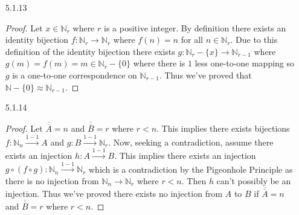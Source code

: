 \documentclass[11pt]{amsart}
\theoremstyle{definition}
\begin{document}
\begin{itemize}
\item[5.1.13] \begin{proof}
		Let $x\in\mathbb{N}_r$ where $r$ is a positive integer. By definition there exists an identity bijection $f:\mathbb{N}_r\to\mathbb{N}_r$ where $f(n)=n$ for all $n\in\mathbb{N}_r$. Due to this definition of the identity bijection there exists $g:\mathbb{N}_r-\{x\}\to\mathbb{N}_{r-1}$ where $g(m)=f(m)=m\in\mathbb{N}_r-\{0\}$ where there is $1$ less one-to-one mapping so $g$ is a one-to-one correspondence on $\mathbb{N}_{r-1}$. Thus we've proved that $\mathbb{N}-\{0\}\approx\mathbb{N}_{r-1}$.
\end{proof}

\item[5.1.14] \begin{proof}
		Let $\overline{\overline A}=n$ and $\overline{\overline B}=r$ where $r<n$. This implies there exists bijections $f:\mathbb{N}_n\xrightarrow{1-1}A$ and $g:B\xrightarrow{1-1}\mathbb{N}_r$. Now, seeking a contradiction, assume there exists an injection $h:A\xrightarrow{1-1}B$. This implies there exists an injection $g\circ(f\circ g):\mathbb{N}_n\xrightarrow{1-1}\mathbb{N}_r$ which is a contradiction by the Pigeonhole Principle as there is no injection from $\mathbb{N}_n\to\mathbb{N}_r$ where $r<n$. Then $h$ can't possibly be an injection. Thus we've proved there exists no injection from $A$ to $B$ if $\overline{\overline A}=n$ and $\overline{\overline B}=r$ where $r<n$.
\end{proof}


\end{itemize}
\end{document}
